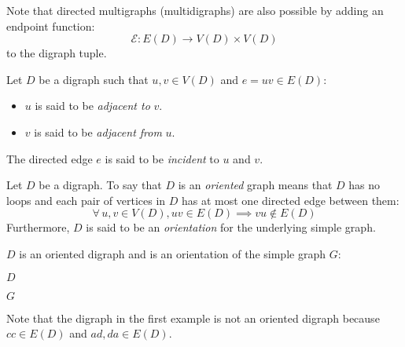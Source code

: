 \documentclass[letterpaper,12pt,fleqn]{article}
\newcommand{\E}{\mathscr{E}}
\begin{document}
Note that directed multigraphs (multidigraphs) are also possible by adding an endpoint function:
\[\E:E(D)\to V(D)\times V(D)\]
to the digraph tuple.

\begin{definition}
  Let \(D\) be a digraph such that \(u,v\in V(D)\) and \(e=uv\in E(D)\):
  \begin{itemize}
    \item \(u\) is said to be \emph{adjacent to} \(v\).
    \item \(v\) is said to be \emph{adjacent from} \(u\).
  \end{itemize}
  The directed edge \(e\) is said to be \emph{incident} to \(u\) and \(v\).
\end{definition}

\begin{definition}[Orientation]
  Let \(D\) be a digraph.  To say that \(D\) is an \emph{oriented} graph means that \(D\) has no loops and each
  pair of vertices in \(D\) has at most one directed edge between them:
  \[\forall\,u,v\in V(D),uv\in E(D)\implies vu\notin E(D)\]
  Furthermore, \(D\) is said to be an \emph{orientation} for the underlying simple graph.
\end{definition}

\begin{example}
  \(D\) is an oriented digraph and is an orientation of the simple graph \(G\):

  \bigskip

  \begin{minipage}[t]{3in}
    \begin{center}

      \bigskip

      \(D\)
    \end{center}
  \end{minipage}
  \begin{minipage}[t]{3in}
    \begin{center}

      \bigskip

      \(G\)
    \end{center}
  \end{minipage}
\end{example}

Note that the digraph in the first example is not an oriented digraph because \(cc\in E(D)\) and \(ad,da\in E(D)\).
\end{document}
